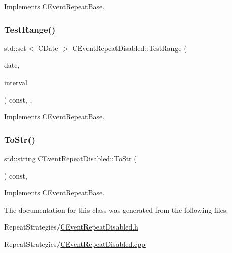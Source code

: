 Implements \mbox{\hyperlink{class_c_event_repeat_base_a73b079543ea6d97d38933b6a7544e349}{C\+Event\+Repeat\+Base}}.

\mbox{\label{class_c_event_repeat_disabled_a0d9196c321d405660223d46c3c1ab27e}} 
\subsubsection{\texorpdfstring{Test\+Range()}{TestRange()}}
{\footnotesize\ttfamily std\+::set$<$ \mbox{\hyperlink{class_c_date}{C\+Date}} $>$ C\+Event\+Repeat\+Disabled\+::\+Test\+Range (\begin{DoxyParamCaption}\item[{const \mbox{\hyperlink{class_c_date}{C\+Date}} \&}]{date,  }\item[{const \mbox{\hyperlink{class_c_date_af23472c977b14ed341b48183ec19d874}{C\+Date\+::\+Interval}} \&}]{interval }\end{DoxyParamCaption}) const\hspace{0.3cm}{\ttfamily [override]}, {\ttfamily [protected]}, {\ttfamily [virtual]}}



Implements \mbox{\hyperlink{class_c_event_repeat_base_ad8371820b1c9771c93b452e4c80f4cea}{C\+Event\+Repeat\+Base}}.

\mbox{\label{class_c_event_repeat_disabled_a58cfa9f6921c351c85f747e80183842b}} 
\subsubsection{\texorpdfstring{To\+Str()}{ToStr()}}
{\footnotesize\ttfamily std\+::string C\+Event\+Repeat\+Disabled\+::\+To\+Str (\begin{DoxyParamCaption}{ }\end{DoxyParamCaption}) const\hspace{0.3cm}{\ttfamily [override]}, {\ttfamily [virtual]}}



Implements \mbox{\hyperlink{class_c_event_repeat_base_acf60d2b0890fdb3e701c944b26186197}{C\+Event\+Repeat\+Base}}.



The documentation for this class was generated from the following files\+:\begin{DoxyCompactItemize}
\item 
Repeat\+Strategies/\mbox{\hyperlink{_c_event_repeat_disabled_8h}{C\+Event\+Repeat\+Disabled.\+h}}\item 
Repeat\+Strategies/\mbox{\hyperlink{_c_event_repeat_disabled_8cpp}{C\+Event\+Repeat\+Disabled.\+cpp}}\end{DoxyCompactItemize}
